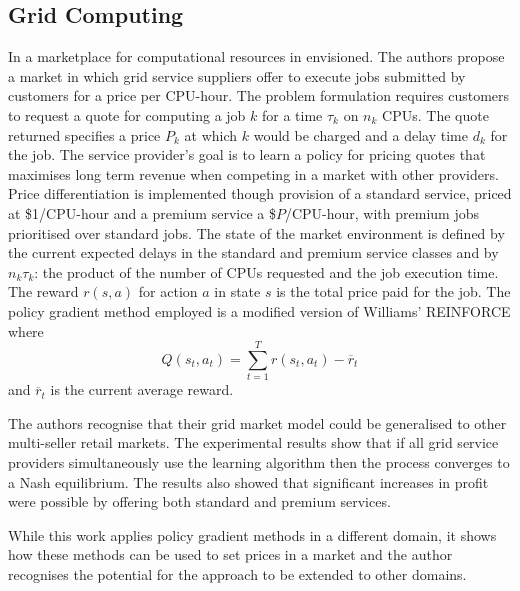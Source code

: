 \subsection{Grid Computing}
In  a marketplace for computational resources in
envisioned.  The authors propose a market in which grid service suppliers offer
to execute jobs submitted by customers for a price per CPU-hour.  The problem
formulation requires customers to request a quote for computing a job $k$ for a
time $\tau_k$ on $n_k$ CPUs.  The quote returned specifies a price $P_k$ at
which $k$ would be charged and a delay time $d_k$ for the job.  The service
provider's goal is to learn a policy for pricing quotes that maximises long
term revenue when competing in a market with other providers.  Price
differentiation is implemented though provision of a standard service, priced
at \$1/CPU-hour and a premium service a \$$P$/CPU-hour, with premium jobs
prioritised over standard jobs.  The state of the market environment is
defined by the current expected delays in the standard and premium service
classes and by $n_k \tau_k$: the product of the number of CPUs requested and
the job execution time.  The reward $r(s,a)$ for action $a$ in state $s$ is the
total price paid for the job.  The policy gradient method employed is a
modified version of Williams' REINFORCE \cite{williams:reinforce} where
\begin{equation}
Q(s_t,a_t) = \sum_{t=1}^T r(s_t,a_t) - \overline{r}_t
\end{equation}
and $\overline{r}_t$ is the current average reward.

The authors recognise that their grid market model could be generalised to
other multi-seller retail markets.  The experimental results show that if
all grid service providers simultaneously use the learning algorithm then the
process converges to a Nash equilibrium.  The results also showed that
significant increases in profit were possible by offering both standard and
premium services.

While this work applies policy gradient methods in a different domain, it shows
how these methods can be used to set prices in a market and the author
recognises the potential for the approach to be extended to other domains.


